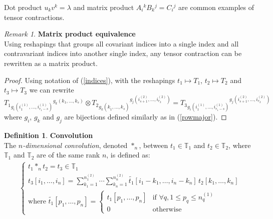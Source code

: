 \documentclass{article}
\theoremstyle{definition}
\newtheorem{definition}{Definition}[section]
\theoremstyle{remark}
\newtheorem{remark}{Remark}
\theoremstyle{plain}
\newcommand{\tspace}{\mathbb{T}}
\begin{document}
Dot product $u_k v^k = \lambda $ and matrix product $A_i\hspace{0pt}^k B_k\hspace{0pt}^j = C_i\hspace{0pt}^j$ are common examples of tensor contractions.

\begin{remark}\textbf{Matrix product equivalence}\\
Using reshapings that groups all covariant indices into a single index and all contravariant indices into another single index, any tensor contraction can be rewritten as a matrix product.
\end{remark}
\begin{proof}
Using notation of (\ref{indices}), with the reshapings $t_1 \mapsto T_1$, $t_2 \mapsto T_2$ and $t_3 \mapsto T_3$ we can rewrite
$$
T_1 \hspace{0pt}_{g_i(i_1^{(1)}, \ldots, i_{r_1-s}^{(1)})} \hspace{0pt}^{g_k(k_1, \ldots, k_s)} \otimes
T_2 \hspace{0pt}_{g_k(k_1^{\phantom{(}}, \ldots, k_s^{\phantom{(}})} \hspace{0pt}^{g_j(i_{s+1}^{(2)}, \ldots, i_{r_2}^{(2)})} =
T_3 \hspace{0pt}_ {g_i(i_1^{(1)}, \ldots, i_{r_1-s}^{(1)})} \hspace{0pt}^{g_j(i_{s+1}^{(2)}, \ldots, i_{r_2}^{(2)})}
$$
where $g_i$, $g_k$ and $g_j$ are bijections defined similarly as in (\ref{rowmajor}).
\end{proof}

\begin{definition}\textbf{Convolution}\\
The \emph{$n$-dimensional convolution}, denoted $\ast_n$, between $t_1 \in \tspace_1$ and $t_2 \in \tspace_2$, where $\tspace_1$ and $\tspace_2$ are of the same rank $n$, is defined as:
\begin{gather*}
\left\{
  \begin{array}{l}
    t_1 \ast_n t_2 = t_3 \in \tspace_1 \\
    t_3[i_1, \ldots, i_n] =
    \displaystyle \sum_{k_1=1}^{n_1^{(2)}} \cdots \sum_{k_n=1}^{n_n^{(2)}}
    \widetilde{t_1}[i_1 - k_1, \ldots, i_n - k_n] \hspace{2pt} t_2[k_1, \ldots, k_n] \\
    \text{where } \widetilde{t_1}[p_1, \ldots, p_n] =
    \begin{cases}
      t_1[p_1, \ldots, p_n] & \text{if } \forall q, 1 \le p_q \le n_q^{(1)} \\
      0 & \text{otherwise}
    \end{cases}
  \end{array}
\right.
\end{gather*}
\end{definition}
\end{document}
